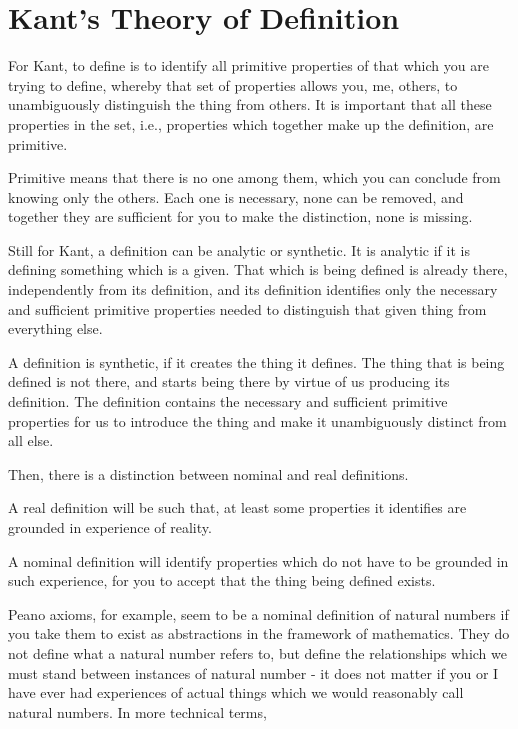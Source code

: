 \section{Kant's Theory of Definition}
\label{c4:s2}
For Kant, to define is to identify all primitive properties of that which you are trying to define, whereby that set of properties allows you, me, others, to unambiguously distinguish the thing from others. It is important that all these properties in the set, i.e., properties which together make up the definition, are primitive. 

Primitive means that there is no one among them, which you can conclude from knowing only the others. Each one is necessary, none can be removed, and together they are sufficient for you to make the distinction, none is missing.\cite{kant1999critique,kant2004lectures,beck1956kant} 

Still for Kant, a definition can be analytic or synthetic. It is analytic if it is defining something which is a given. That which is being defined is already there, independently from its definition, and its definition identifies only the necessary and sufficient primitive properties needed to distinguish that given thing from everything else. 

A definition is synthetic, if it creates the thing it defines. The thing that is being defined is not there, and starts being there by virtue of us producing its definition. The definition contains the necessary and sufficient primitive properties for us to introduce the thing and make it unambiguously distinct from all else.

Then, there is a distinction between nominal and real definitions. 

A real definition will be such that, at least some properties it identifies are grounded in experience of reality. 

A nominal definition will identify properties which do not have to be grounded in such experience, for you to accept that the thing being defined exists. 

Peano axioms, for example, seem to be a nominal definition of natural numbers if you take them to exist as abstractions in the framework of mathematics. They do not define what a natural number refers to, but define the relationships which we must stand between instances of natural number - it does not matter if you or I have ever had experiences of actual things which we would reasonably call natural numbers. In more technical terms,

